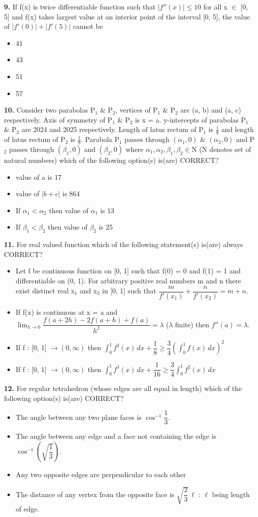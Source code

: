 \documentclass[10pt,twocolumn]{extarticle}
\newenvironment{qoptions}{\begin{itemize}[leftmargin=1.8em,itemsep=2pt,topsep=2pt,label={}]}{\end{itemize}}
\newcommand{\opt}[2]{\item[({#1})] {#2}}
\begin{document}
\textbf{9.} If f(x) is twice differentiable function such that $|f''(x)|\leqslant10$ for all x $\in$ [0, 5] and f(x) takes largest value at an interior point of the interval [0, 5], the value of $|f'(0)|+|f'(5)|$ cannot be

\begin{qoptions}
\opt{A}{41}
\opt{B}{43}
\opt{C}{51}
\opt{D}{57}
\end{qoptions}

\textbf{10.} Consider two parabolas P$_1$ \& P$_2$, vertices of P$_1$ \& P$_2$ are (a, b) and (a, c) respectively. Axis of symmetry of P$_1$ \& P$_2$ is x = a. y-intercepts of parabolas P$_1$ \& P$_2$ are 2024 and 2025 respectively. Length of latus rectum of P$_1$ is $\tfrac18$ and length of latus rectum of P$_2$ is $\tfrac19$. Parabola P$_1$ passes through $(\alpha_1,0)$ \& $(\alpha_2,0)$ and P$_2$ passes through $(\beta_1,0)$ and $(\beta_2,0)$ where $\alpha_1,\alpha_2,\beta_1,\beta_2\in$N (N denotes set of natural numbers) which of the following option(s) is(are) CORRECT?

\begin{qoptions}
\opt{A}{value of a is 17}
\opt{B}{value of $|b+c|$ is 864}
\opt{C}{If $\alpha_1<\alpha_2$ then value of $\alpha_1$ is 13}
\opt{D}{If $\beta_1<\beta_2$ then value of $\beta_2$ is 25}
\end{qoptions}

\textbf{11.} For real valued function which of the following statement(s) is(are) always CORRECT?

\begin{qoptions}
\opt{A}{Let f be continuous function on [0, 1] such that f(0) = 0 and f(1) = 1 and differentiable on (0, 1). For arbitrary positive real numbers m and n there exist distinct real x$_1$ and x$_2$ in [0, 1] such that $\dfrac{m}{f'(x_1)}+\dfrac{n}{f'(x_2)}=m+n$.}
\opt{B}{If f(x) is continuous at x = a and $\displaystyle\lim_{h\to0}\dfrac{f(a+2h)-2f(a+h)+f(a)}{h^2}=\lambda$ ($\lambda$ finite) then $f''(a)=\lambda$.}
\opt{C}{If f : [0, 1] $\to(0,\infty)$ then $\displaystyle\int_0^1 f^3(x)\,dx+\dfrac18\geqslant\dfrac34\left(\int_0^1 f(x)\,dx\right)^2$}
\opt{D}{If f : [0, 1] $\to(0,\infty)$ then $\displaystyle\int_0^1 f^3(x)\,dx+\dfrac1{16}\geqslant\dfrac34\int_0^1 f^2(x)\,dx$}
\end{qoptions}

\textbf{12.} For regular tetrahedron (whose edges are all equal in length) which of the following option(s) is(are) CORRECT?

\begin{qoptions}
\opt{A}{The angle between any two plane faces is $\cos^{-1}\dfrac13$.}
\opt{B}{The angle between any edge and a face not containing the edge is $\cos^{-1}\left(\sqrt{\dfrac13}\right)$.}
\opt{C}{Any two opposite edges are perpendicular to each other}
\opt{D}{The distance of any vertex from the opposite face is $\sqrt{\dfrac23}\,\ell$ : $\ell$ being length of edge.}
\end{qoptions}
\end{document}
